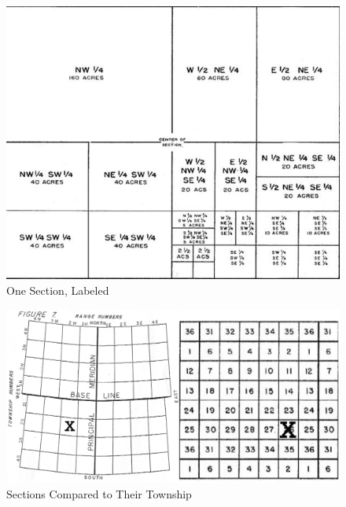 \documentclass[
  letterpaper,
  twocolumn,
  portrait]{scrbook}
\begin{document}
\begin{figure}

{\centering \includegraphics{one-section.png}

}

\caption{\label{fig-labeled}One Section, Labeled}

\end{figure}

\begin{figure}

{\centering \includegraphics{township-and-section.png}

}

\caption{\label{fig-both}Sections Compared to Their Township}

\end{figure}
\end{document}
